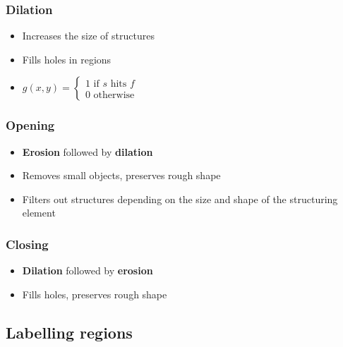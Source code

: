 \documentclass{article}
\begin{document}
        \subsubsection{Dilation}
        \begin{itemize}
            \item Increases the size of structures
            \item Fills holes in regions
            \item $g(x, y) =
            \begin{cases}
                1 \text{ if } s \text{ hits } f \\
                0 \text{ otherwise }
            \end{cases}$
        \end{itemize}

        \subsubsection{Opening}
        \begin{itemize}
            \item \textbf{Erosion} followed by \textbf{dilation}
            \item Removes small objects, preserves rough shape
            \item Filters out structures depending on the size and shape of the structuring element
        \end{itemize}

        \subsubsection{Closing}
        \begin{itemize}
            \item \textbf{Dilation} followed by \textbf{erosion}
            \item Fills holes, preserves rough shape
        \end{itemize}

    \subsection{Labelling regions}
\end{document}

